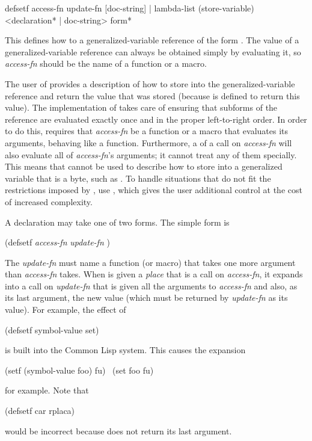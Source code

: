 \begin{defmac}
defsetf access-fn {update-fn [doc-string] | lambda-list (store-variable) <{declaration}* | doc-string> {form}*}

This defines how to  a generalized-variable reference
of the form .  The value of a generalized-variable
reference can always be obtained simply by evaluating it, so \emph{access-fn}
should be the name of a function or a macro.

The user of  provides a description of how to store into the
generalized-variable reference and return the value that was stored (because
 is defined to return this value).  The implementation
of  takes care of
ensuring that subforms of the reference are evaluated exactly once and
in the proper left-to-right order.  In order to do this,
 requires that \emph{access-fn} be a function or a macro
that evaluates its arguments, behaving like a function.
Furthermore, a  of a call on \emph{access-fn} will also evaluate
all of \emph{access-fn}'s arguments; it cannot treat any of them specially.
This means that  cannot be used to describe how to store into
a generalized variable that is a byte, such as .
To handle situations that do not fit the restrictions imposed by ,
use , which gives the user additional control
at the cost of increased complexity.

A  declaration may take one of two forms.
The simple form is
\begin{lisp}
(defsetf \emph{access-fn} \emph{update-fn} )
\end{lisp}
The \emph{update-fn} must name a function (or macro) that takes one more argument
than \emph{access-fn} takes.  When  is given a \emph{place}
that is a call on \emph{access-fn}, it expands into
a call on \emph{update-fn} that is given all the arguments to
\emph{access-fn} and also, as its last argument, the new value
(which must be returned by \emph{update-fn} as its value).
For example, the effect of
\begin{lisp}
(defsetf symbol-value set)
\end{lisp}
is built into the Common Lisp system.
This causes the expansion
\begin{lisp}
(setf (symbol-value foo) fu) \EX\ (set foo fu)
\end{lisp}
for example.  Note that
\begin{lisp}
(defsetf car rplaca)
\end{lisp}
would be incorrect because  does not return its last argument.


\end{defmac}
